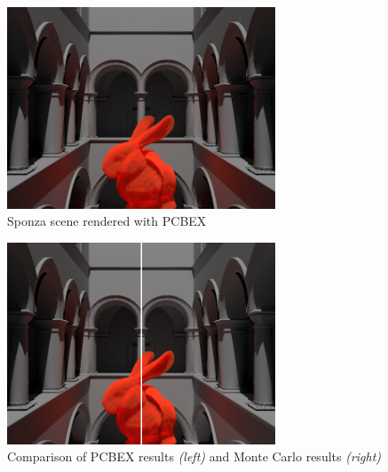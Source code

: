 \documentclass[10pt,compress,professionalfont]{beamer}
\begin{document}
\begin{frame}[c]{}

    {\centering
    \includegraphics[width=80mm]{../img/sponza}\\
    }
    {\centering\scriptsize Sponza scene rendered with PCBEX\\}

\end{frame}




\begin{frame}[c]{}

    {\centering
    \includegraphics[width=80mm]{../img/compare}\\
    }
    {\centering\scriptsize Comparison of PCBEX results \textit{(left)} and Monte Carlo results \textit{(right)}\\}

\end{frame}
\end{document}
